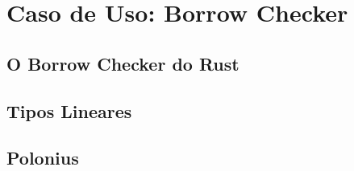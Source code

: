 \chapter{Caso de Uso: Borrow Checker}


\section{O Borrow Checker do Rust}

\section{Tipos Lineares}

\section{Polonius}
